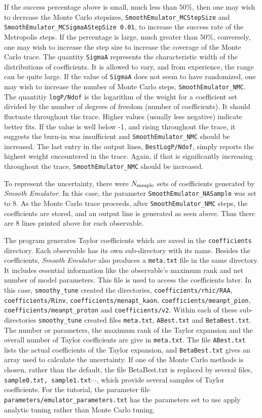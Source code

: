 \documentclass[UserManual.tex]{subfiles}
\begin{document}
If the success percentage above is small, much less than 50\%, then one may wish to decrease the Monte Carlo stepsizes, {\tt SmoothEmulator\_MCStepSize} and {\tt SmoothEmulator\_MCSigmaAStepSize 0.01}, to increase the success rate of the Metropolis steps. If the percentage is large, much greater than 50\%, conversely, one may wish to increase the step size to increase the coverage of the Monte Carlo trace. The quantity {\tt SigmaA} represents the characteristic width of the distributions of coefficients. It is allowed to vary, and from experience, the range can be quite large. If the value of {\tt SigmaA} does not seem to have randomized, one may wish to increase the number of Monte Carlo steps, {\tt  SmoothEmulator\_NMC}. The quantitiy {\tt logP/Ndof} is the logarithm of the weight for a coefficient set divided by the number of degrees of freedom (number of coefficients). It should fluctuate throughout the trace. Higher values (usually less negative) indicate better fits. If the value is well below -1, and rising throughout the trace, it suggests the burn-in was insufficient and {\tt  SmoothEmulator\_NMC} should be increased. The last entry in the output lines, {\tt BestLogP/Ndof}, simply reports the highest weight encountered in the trace. Again, if that is significantly increasing throughout the trace, {\tt  SmoothEmulator\_NMC} should be increased. 

To represent the uncertainty, there were $N_{\rm sample}$ sets of coefficients generated by {\it Smooth Emulator}. In this case, the parameter {\tt SmoothEmulator\_NASample} was set to 8. As the Monte Carlo trace proceeds, after {\tt SmoothEmulator\_NMC} steps, the coefficients are stored, and an output line is generated as seen above. Thus there are 8 lines printed above for each observable.

The program generates Taylor coefficients which are saved in the {\tt coefficients} directory. Each observable has its own sub-directory with its name. Besides the coefficients, {\it Smooth Emulator} also produces a {\tt meta.txt} file in the same directory. It includes essential information like the observable's maximum rank and net number of model parameters. This file is used to access the coefficients later. In this case, {\tt smoothy\_tune} created the directories, {\tt coefficients/rhic/RAA}, {\tt coefficients/Rinv}, {\tt coefficients/menapt\_kaon}, {\tt coefficients/meanpt_pion}, {\tt coefficients/meanpt_proton} and {\tt coefficients/v2}. Within each of these sub-directories {\tt smoothy\_tune} created files {\tt meta.txt}, {\tt ABest.txt} and {\tt BetaBest.txt}. The number or parameters, the maximum rank of the Taylor expansion and the overall number of Taylor coefficients are give in {\tt meta.txt}. The file {\tt ABest.txt} lists the actual coefficients of the Taylor expansion, and {\tt BetaBest.txt} gives an array used to calculate the uncertainty. If one of the Monte Carlo methods is chosen, rather than the default, the file {BetaBest.txt} is replaced by several files, {\tt sample0.txt, sample1.txt}$\cdots$, which provide several samples of Taylor coefficients. For the tutorial, the parameter file {\tt parameters/emulator\_parameters.txt} has the parameters set to use apply analytic tuning rather than Monte Carlo tuning.
\end{document}
